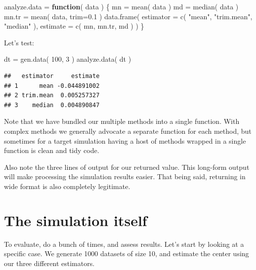\documentclass[
]{book}
\newenvironment{Shaded}{\begin{snugshade}}{\end{snugshade}}
\newcommand{\AttributeTok}[1]{\textcolor[rgb]{0.77,0.63,0.00}{#1}}
\newcommand{\ControlFlowTok}[1]{\textcolor[rgb]{0.13,0.29,0.53}{\textbf{#1}}}
\newcommand{\DecValTok}[1]{\textcolor[rgb]{0.00,0.00,0.81}{#1}}
\newcommand{\FloatTok}[1]{\textcolor[rgb]{0.00,0.00,0.81}{#1}}
\newcommand{\FunctionTok}[1]{\textcolor[rgb]{0.00,0.00,0.00}{#1}}
\newcommand{\NormalTok}[1]{#1}
\newcommand{\OtherTok}[1]{\textcolor[rgb]{0.56,0.35,0.01}{#1}}
\newcommand{\StringTok}[1]{\textcolor[rgb]{0.31,0.60,0.02}{#1}}
\begin{document}
\begin{Shaded}
\begin{Highlighting}[]
\NormalTok{analyze.data }\OtherTok{=} \ControlFlowTok{function}\NormalTok{( data ) \{}
\NormalTok{    mn }\OtherTok{=} \FunctionTok{mean}\NormalTok{( data )}
\NormalTok{    md }\OtherTok{=} \FunctionTok{median}\NormalTok{( data )}
\NormalTok{    mn.tr }\OtherTok{=} \FunctionTok{mean}\NormalTok{( data, }\AttributeTok{trim=}\FloatTok{0.1}\NormalTok{ )}
    \FunctionTok{data.frame}\NormalTok{( }\AttributeTok{estimator =} \FunctionTok{c}\NormalTok{( }\StringTok{"mean"}\NormalTok{, }\StringTok{"trim.mean"}\NormalTok{, }\StringTok{"median"}\NormalTok{ ),}
                \AttributeTok{estimate =} \FunctionTok{c}\NormalTok{( mn, mn.tr, md ) )}
\NormalTok{\}}
\end{Highlighting}
\end{Shaded}

Let's test:

\begin{Shaded}
\begin{Highlighting}[]
\NormalTok{dt }\OtherTok{=} \FunctionTok{gen.data}\NormalTok{( }\DecValTok{100}\NormalTok{, }\DecValTok{3}\NormalTok{ )}
\FunctionTok{analyze.data}\NormalTok{( dt )}
\end{Highlighting}
\end{Shaded}

\begin{verbatim}
##   estimator     estimate
## 1      mean -0.044891002
## 2 trim.mean  0.005257327
## 3    median  0.004890847
\end{verbatim}

Note that we have bundled our multiple methods into a single function.
With complex methods we generally advocate a separate function for each method, but sometimes for a target simulation having a host of methods wrapped in a single function is clean and tidy code.

Also note the three lines of output for our returned value.
This long-form output will make processing the simulation results easier.
That being said, returning in wide format is also completely legitimate.

\hypertarget{the-simulation-itself}{%
\section{The simulation itself}\label{the-simulation-itself}}

To evaluate, do a bunch of times, and assess results. Let's start by looking
at a specific case. We generate 1000 datasets of size 10, and estimate the
center using our three different estimators.
\end{document}
